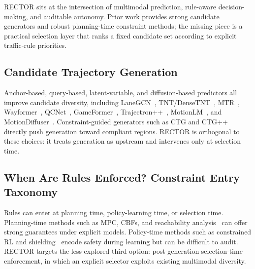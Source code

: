 RECTOR sits at the intersection of multimodal prediction, rule-aware decision-making, and auditable autonomy. Prior work provides strong candidate generators and robust planning-time constraint methods; the missing piece is a practical selection layer that ranks a fixed candidate set according to explicit traffic-rule priorities.

\subsection{Candidate Trajectory Generation}
\label{subsec:candidate_generation}

Anchor-based, query-based, latent-variable, and diffusion-based predictors all improve candidate diversity, including LaneGCN~\cite{liang2020lanegcn}, TNT/DenseTNT~\cite{zhao2021tnt,gu2021densetnt}, MTR~\cite{shi2022motion}, Wayformer~\cite{nayakanti2023wayformer}, QCNet~\cite{zhou2023qcnet}, GameFormer~\cite{huang2023gameformer}, Trajectron++~\cite{salzmann2020trajectron}, MotionLM~\cite{seff2023motionlm}, and MotionDiffuser~\cite{jiang2023motiondiffuser}. Constraint-guided generators such as CTG and CTG++~\cite{zhong2023ctg,zhong2023ctgpp} directly push generation toward compliant regions. RECTOR is orthogonal to these choices: it treats generation as upstream and intervenes only at selection time.

\subsection{When Are Rules Enforced? Constraint Entry Taxonomy}
\label{subsec:constraint_entry_taxonomy}

Rules can enter at planning time, policy-learning time, or selection time. Planning-time methods such as MPC, CBFs, and reachability analysis~\cite{borrelli2005mpc,ames2017control,althoff2010reachability} can offer strong guarantees under explicit models. Policy-time methods such as constrained RL and shielding~\cite{altman1999constrained,achiam2017constrained,vitelli2022safetynet} encode safety during learning but can be difficult to audit. RECTOR targets the less-explored third option: post-generation selection-time enforcement, in which an explicit selector exploits existing multimodal diversity.

